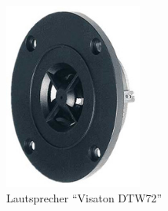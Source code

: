 \begin{figure} [H]
	\centering
	\includegraphics[width=0.4\textwidth]{img/LSMessung/HT/dtw72.jpg}
	\caption[Lautsprecher \enquote{Visaton DTW72}]{Lautsprecher \enquote{Visaton DTW72}\footnotemark}
	\label{fig:4.3.7}
\end{figure}
